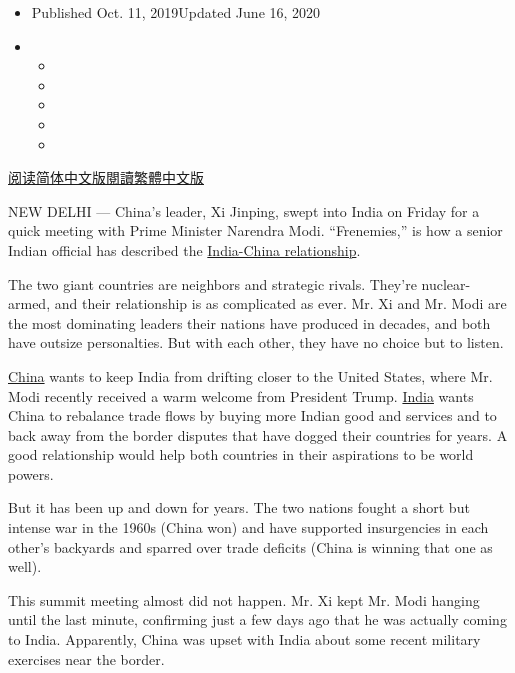 \begin{itemize}
\item
  Published Oct. 11, 2019Updated June 16, 2020
\item
  \begin{itemize}
  \item
  \item
  \item
  \item
  \item
  \end{itemize}
\end{itemize}

\href{https://cn.nytimes.com/world/20191012/narendra-modi-xi-jinping-india-china/}{阅读简体中文版}\href{https://cn.nytimes.com/world/20191012/narendra-modi-xi-jinping-india-china/zh-hant/}{閱讀繁體中文版}

NEW DELHI --- China's leader, Xi Jinping, swept into India on Friday for
a quick meeting with Prime Minister Narendra Modi. ``Frenemies,'' is how
a senior Indian official has described the
\href{https://www.nytimes.com/2018/04/26/world/asia/narendra-modi-xi-jinping-china-india.html}{India-China
relationship}.

The two giant countries are neighbors and strategic rivals. They're
nuclear-armed, and their relationship is as complicated as ever. Mr. Xi
and Mr. Modi are the most dominating leaders their nations have produced
in decades, and both have outsize personalties. But with each other,
they have no choice but to listen.

\href{https://www.nytimes.com/2020/06/16/world/asia/india-china-border.html}{China}
wants to keep India from drifting closer to the United States, where Mr.
Modi recently received a warm welcome from President Trump.
\href{https://www.nytimes.com/2020/06/16/world/asia/india-china-border.html}{India}
wants China to rebalance trade flows by buying more Indian good and
services and to back away from the border disputes that have dogged
their countries for years. A good relationship would help both countries
in their aspirations to be world powers.

But it has been up and down for years. The two nations fought a short
but intense war in the 1960s (China won) and have supported insurgencies
in each other's backyards and sparred over trade deficits (China is
winning that one as well).

This summit meeting almost did not happen. Mr. Xi kept Mr. Modi hanging
until the last minute, confirming just a few days ago that he was
actually coming to India. Apparently, China was upset with India about
some recent military exercises near the border.

